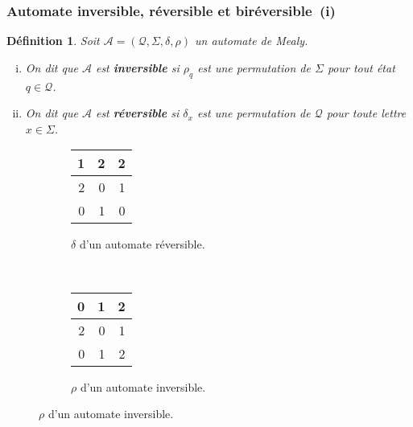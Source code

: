\documentclass[11pt]{beamer}
\newtheorem{defi}{Définition}
\begin{document}
\begin{frame}
  \frametitle{Automate inversible, réversible et biréversible~(i)}

  \begin{defi}
    Soit $\mathcal{A}=\left(\mathcal{Q}, \Sigma, \delta, \rho\right)$ un automate de Mealy.
    \begin{enumerate}[(i)]
    \item On dit que $\mathcal{A}$ est \textbf{inversible} si $\rho_q$ est une permutation de $\Sigma$ pour tout état $q\in\mathcal{Q}$.
    \item On dit que $\mathcal{A}$ est \textbf{réversible} si $\delta_x$ est une permutation de $\mathcal{Q}$ pour toute lettre $x\in\Sigma$.
    \end{enumerate}
  \end{defi}

  \begin{figure}[!ht]
    \begin{subfigure}[b]{0.45\textwidth}
      \centering
      \begin{tabular}{|r|r|r|}
        \hline
        1 & 2 & 2 \\
        \hline
        2 & 0 & 1 \\
        \hline
        0 & 1 & 0 \\
        \hline
      \end{tabular}
      \caption{$\delta$ d'un automate réversible.}
    \end{subfigure}
    ~
    \begin{subfigure}[b]{0.45\textwidth}
      \centering
      \begin{tabular}{|r|r|r|}
        \hline
        0 & 1 & 2 \\
        \hline
        2 & 0 & 1 \\
        \hline
        0 & 1 & 2 \\
        \hline
      \end{tabular}
      \caption{$\rho$ d'un automate inversible.}
    \end{subfigure}
  \end{figure}


\end{frame}
\end{document}
